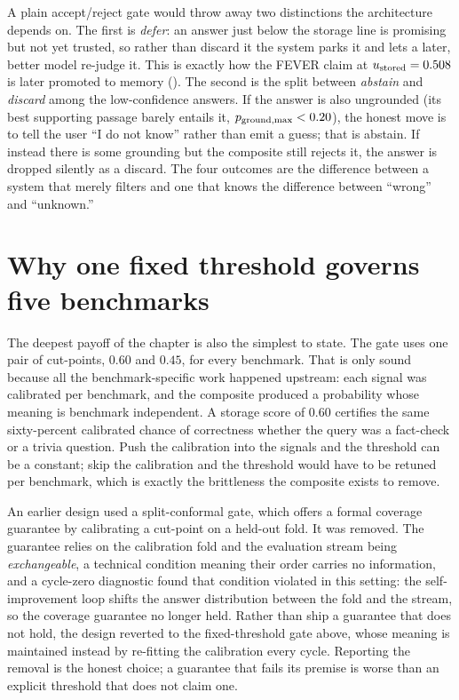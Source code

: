 \begin{intuition}
A plain accept/reject gate would throw away two distinctions the architecture depends
on. The first is \emph{defer}: an answer just below the storage line is promising but
not yet trusted, so rather than discard it the system parks it and lets a later, better
model re-judge it. This is exactly how the FEVER claim at $u_{\text{stored}} = 0.508$ is later
promoted to memory (). The second is the split between \emph{abstain}
and \emph{discard} among the low-confidence answers. If the answer is also ungrounded
(its best supporting passage barely entails it, $p_{\text{ground,max}} < 0.20$), the honest move is to
tell the user ``I do not know'' rather than emit a guess; that is abstain. If instead
there is some grounding but the composite still rejects it, the answer is dropped
silently as a discard. The four outcomes are the difference between a system that
merely filters and one that knows the difference between ``wrong'' and ``unknown.''
\end{intuition}

\section{Why one fixed threshold governs five benchmarks}
\label{sec:composite-fixed}

The deepest payoff of the chapter is also the simplest to state. The gate uses one
pair of cut-points, $0.60$ and $0.45$, for every benchmark. That is only sound because
all the benchmark-specific work happened upstream: each signal was calibrated per
benchmark, and the composite produced a probability whose meaning is benchmark
independent. A storage score of $0.60$ certifies the same sixty-percent calibrated
chance of correctness whether the query was a fact-check or a trivia question. Push the
calibration into the signals and the threshold can be a constant; skip the calibration
and the threshold would have to be retuned per benchmark, which is exactly the
brittleness the composite exists to remove.

\begin{defence}
An earlier design used a split-conformal gate, which offers a formal coverage
guarantee by calibrating a cut-point on a held-out fold. It was removed. The
guarantee relies on the calibration fold and the evaluation stream being
\emph{exchangeable}, a technical condition meaning their order carries no information,
and a cycle-zero diagnostic found that condition violated in this setting: the
self-improvement loop shifts the answer distribution between the fold and the stream,
so the coverage guarantee no longer held. Rather than ship a guarantee that does not
hold, the design reverted to the fixed-threshold gate above, whose meaning is
maintained instead by re-fitting the calibration every cycle. Reporting the removal is
the honest choice; a guarantee that fails its premise is worse than an explicit
threshold that does not claim one.
\end{defence}

